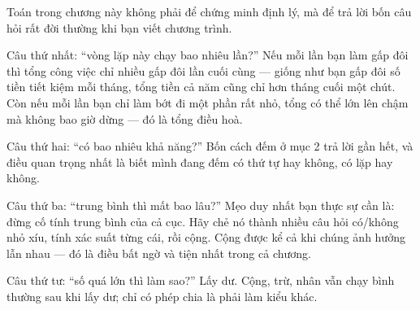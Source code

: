 \documentclass[../../algorithm.tex]{subfiles}
\begin{document}
\begin{dongian}
Toán trong chương này không phải để chứng minh định lý, mà để trả lời bốn câu hỏi rất đời thường khi bạn viết chương trình.

Câu thứ nhất: ``vòng lặp này chạy bao nhiêu lần?'' Nếu mỗi lần bạn làm gấp đôi thì tổng công việc chỉ nhiều gấp đôi lần cuối cùng --- giống như bạn gấp đôi số tiền tiết kiệm mỗi tháng, tổng tiền cả năm cũng chỉ hơn tháng cuối một chút. Còn nếu mỗi lần bạn chỉ làm bớt đi một phần rất nhỏ, tổng có thể lớn lên chậm mà không bao giờ dừng --- đó là tổng điều hoà.

Câu thứ hai: ``có bao nhiêu khả năng?'' Bốn cách đếm ở mục 2 trả lời gần hết, và điều quan trọng nhất là biết mình đang đếm có thứ tự hay không, có lặp hay không.

Câu thứ ba: ``trung bình thì mất bao lâu?'' Mẹo duy nhất bạn thực sự cần là: đừng cố tính trung bình của cả cục. Hãy chẻ nó thành nhiều câu hỏi có/không nhỏ xíu, tính xác suất từng cái, rồi cộng. Cộng được kể cả khi chúng ảnh hưởng lẫn nhau --- đó là điều bất ngờ và tiện nhất trong cả chương.

Câu thứ tư: ``số quá lớn thì làm sao?'' Lấy dư. Cộng, trừ, nhân vẫn chạy bình thường sau khi lấy dư; chỉ có phép chia là phải làm kiểu khác.
\end{dongian}
\end{document}
